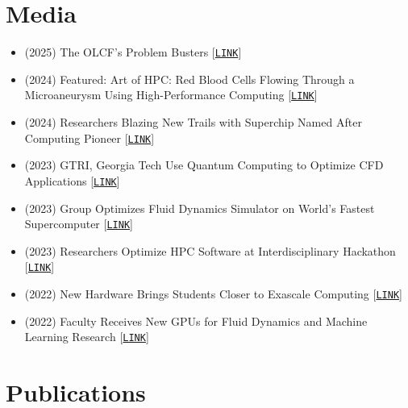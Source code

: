 \section{Media}

\begin{itemize}
    \item (2025) The OLCF's Problem Busters [\href{https://www.olcf.ornl.gov/2025/02/11/the-olcfs-problem-busters/}{\tt LINK}]

    \item (2024) Featured: Art of HPC: Red Blood Cells Flowing Through a Microaneurysm Using High-Performance Computing [\href{https://sites.gatech.edu/research/sc-2024://sites.gatech.edu/research/sc-2024/}{\tt LINK}]

    \item (2024) Researchers Blazing New Trails with Superchip Named After Computing Pioneer [\href{https://www.cc.gatech.edu/news/researchers-blazing-new-trails-superchip-named-after-computing-pioneer}{\tt LINK}] 

    \item (2023) GTRI, Georgia Tech Use Quantum Computing to Optimize CFD Applications
 [\href{https://gtri.gatech.edu/newsroom/gtri-georgia-tech-use-quantum-computing-optimize-cfd-applications}{\tt LINK}]

    \item (2023) Group Optimizes Fluid Dynamics Simulator on World's Fastest Supercomputer [\href{https://www.cc.gatech.edu/news/group-optimizes-fluid-dynamics-simulator-worlds-fastest-supercomputer}{\tt LINK}]

    \item (2023) Researchers Optimize HPC Software at Interdisciplinary Hackathon
[\href{https://www.cc.gatech.edu/news/researchers-optimize-hpc-software-interdisciplinary-hackathon}{\tt LINK}]

    \item (2022) New Hardware Brings Students Closer to Exascale Computing [\href{https://www.cc.gatech.edu/news/new-hardware-brings-students-closer-exascale-computing}{\tt LINK}]

    \item (2022) Faculty Receives New GPUs for Fluid Dynamics and Machine Learning Research [\href{https://www.cc.gatech.edu/news/faculty-receives-new-gpus-fluid-dynamics-and-machine-learning-research}{\tt LINK}]
\end{itemize}

\section{Publications}

